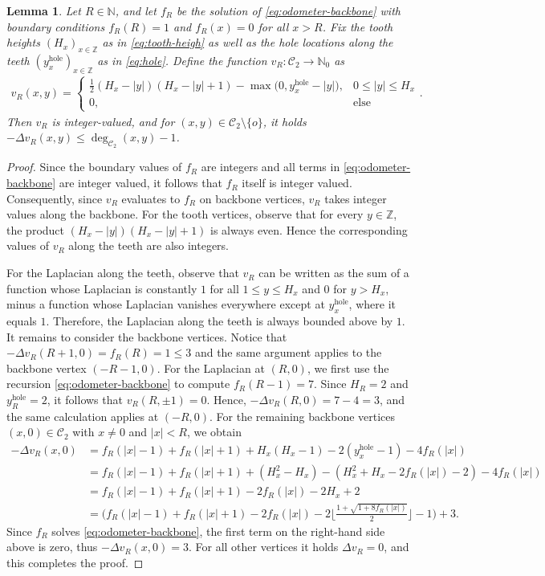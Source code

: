 \documentclass[11pt]{article}
\newtheorem{lemma}{Lemma}[section]
\newcommand{\N}{\mathbb{N}}
\newcommand{\Z}{\mathbb{Z}}
\begin{document}
\begin{lemma}\label{lem:outer-bound-stable}
Let $R\in\N$, and let $f_R$ be the solution of \eqref{eq:odometer-backbone} with boundary conditions $f_R(R)=1$ and $f_R(x)=0$ for all $x>R$. Fix the tooth heights $(H_x)_{x\in\Z}$ as in \eqref{eq:tooth-heigh} as well as the hole locations along the teeth $(y_x^{\text{hole}})_{x\in\Z}$ as in \eqref{eq:hole}. Define the function $v_R:\mathcal{C}_2\to\N_0$ as
\begin{align*}
    v_R(x,y)=\begin{cases}
        \frac{1}{2}(H_x-|y|)(H_x-|y|+1) -\max\bigl(0,y_x^{\mathrm{hole}}-|y|\bigr),&0\leq |y| \leq H_x\\
        0,&\text{else}
    \end{cases}.
\end{align*}
Then $v_R$ is integer-valued, and for   $(x,y)\in\mathcal{C}_2\setminus\{o\}$, it holds $-\Delta v_R(x,y)\leq \deg_{\mathcal{C}_2}(x,y)-1$.
\end{lemma}
\begin{proof}
    Since the boundary values of $f_R$ are integers and all terms in \eqref{eq:odometer-backbone} are integer valued, it follows that $f_R$ itself is integer valued. Consequently, since $v_R$ evaluates to $f_R$ on backbone vertices, $v_R$ takes integer values along the backbone. For the tooth vertices, observe that for every $y\in\mathbb{Z}$, the product $(H_x-|y|)(H_x-|y|+1)$ is always even. Hence the corresponding values of $v_R$ along the teeth are also integers.

    For the Laplacian along the teeth, observe that $v_R$ can be written as the sum of a function whose Laplacian is constantly $1$ for all $1\leq y\leq H_x$ and $0$ for $y>H_x$, minus a function whose Laplacian vanishes everywhere except at $y_x^{\mathrm{hole}}$, where it equals $1$. Therefore, the Laplacian along the teeth is always bounded above by $1$. It remains to consider the backbone vertices. Notice that
    $-\Delta v_R(R+1,0)=f_R(R)=1\leq 3$ and the same argument applies to the backbone vertex $(-R-1,0)$. For the Laplacian at $(R,0)$, we first use the recursion \eqref{eq:odometer-backbone} to compute $f_R(R-1)=7$. Since $H_R=2$ and $y_R^{\mathrm{hole}}=2$, it follows that $v_R(R,\pm 1)=0$. Hence, $-\Delta v_R(R,0)=7-4=3$, and the same calculation applies at $(-R,0)$. For the remaining backbone vertices $(x,0)\in\mathcal{C}_2$ with $x\neq 0$ and $|x|<R$, we obtain
    \begin{align*}
        -\Delta v_R(x,0)&=f_R(|x|-1)+f_R(|x|+1)+H_x(H_x-1)-2(y_x^{\text{hole}}-1)-4f_R(|x|)\\
        &=f_R(|x|-1)+f_R(|x|+1)+(H_x^2-H_x)-(H_x^2+H_x-2f_R(|x|)-2)-4f_R(|x|)\\
        &=f_R(|x|-1)+f_R(|x|+1)-2f_R(|x|)-2H_x+2\\
        &=\Big(f_R(|x|-1)+f_R(|x|+1)-2f_R(|x|)-2\Big\lfloor \frac{1+\sqrt{1+8f_R(|x|)}}{2}\Big\rfloor-1\Big)+3.
    \end{align*}
    Since $f_R$ solves \eqref{eq:odometer-backbone}, the first term on the right-hand side above is zero, thus $-\Delta v_R(x,0)=3$. For all other vertices it holds $\Delta v_R=0$, and this completes the proof.
\end{proof}
\end{document}
